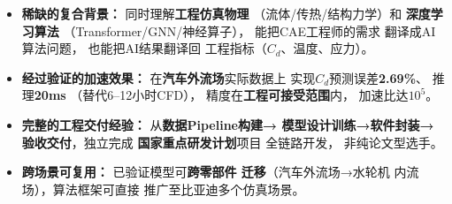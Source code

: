 \documentclass[11pt]{article}
\begin{document}
\begin{itemize}
    \item \textbf{稀缺的复合背景：}
    同时理解\textbf{工程仿真物理}
    （流体/传热/结构力学）和
    \textbf{深度学习算法}
    （Transformer/GNN/神经算子），
    能把CAE工程师的需求
    翻译成AI算法问题，
    也能把AI结果翻译回
    工程指标（$C_d$、温度、应力）。
    
    \item \textbf{经过验证的加速效果：}
    在\textbf{汽车外流场}实际数据上
    实现$C_d$预测误差\textbf{2.69\%}、
    推理\textbf{20ms}
    （替代6--12小时CFD），
    精度在\textbf{工程可接受范围}内，
    加速比达\textbf{$10^5$}。
    
    \item \textbf{完整的工程交付经验：}
    从\textbf{数据Pipeline构建→
    模型设计训练→软件封装→
    验收交付}，独立完成
    \textbf{国家重点研发计划}项目
    全链路开发，
    非纯论文型选手。
    
    \item \textbf{跨场景可复用：}
    已验证模型可\textbf{跨零部件
    迁移}（汽车外流场→水轮机
    内流场），算法框架可直接
    推广至比亚迪多个仿真场景。
\end{itemize}
\end{document}
